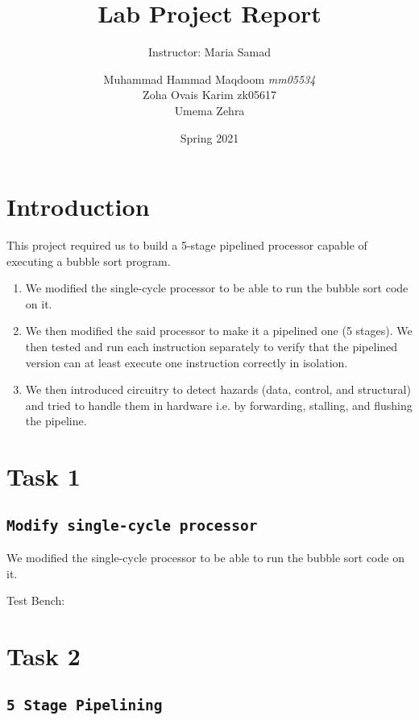 \documentclass[a4paper, 12pt]{report}
\institute{Habib University}
\title{Lab Project Report}
\subtitle{Instructor: Maria Samad}
\author{Muhammad Hammad Maqdoom \textit{mm05534} \\ Zoha Ovais Karim zk05617 \\ Umema Zehra}
\date{Spring 2021}
\begin{document}
    \maketitle
    \romantableofcontents
    \chapter{Introduction}
    
    This project required us to build a 5-stage pipelined processor capable of executing a bubble sort program.
    
    \begin{enumerate}
        \item We modified the single-cycle processor to be able to run the bubble sort code on it.
        \item We then modified the said processor to make it a pipelined one (5 stages). We then tested and run each instruction separately to verify that the pipelined version can at least execute one instruction correctly in isolation.
        \item We then introduced circuitry to detect hazards (data, control, and structural) and tried to handle them in hardware i.e. by forwarding, stalling, and flushing the pipeline.

    \end{enumerate}
    
    
    \chapter{Task 1}
    \section{\texttt{Modify single-cycle processor}}

    We modified the single-cycle processor to be able to run the bubble sort code on it.


    
    Test Bench:
    
   
   \chapter{Task 2}
    \section{\texttt{5 Stage Pipelining}}
    
\end{document}
